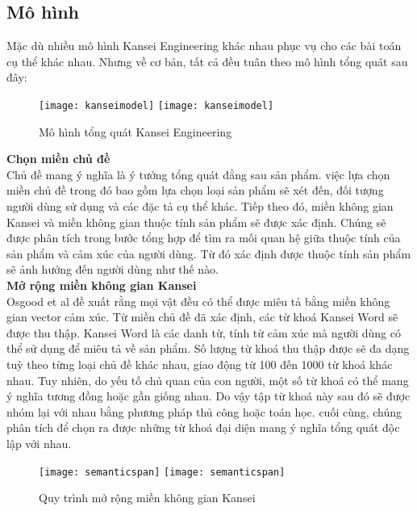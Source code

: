 \subsection{Mô hình}
Mặc dù nhiều mô hình Kansei Engineering khác nhau phục vụ cho các bài toán cụ thể khác nhau. Nhưng về cơ bản, tất cả đều tuân theo mô hình tổng quát \cite{KE05} sau đây:
\begin{figure}[H]
  \begin{center}
    \ifpdf
      \texttt{[image: kanseimodel]}
    \else
      \texttt{[image: kanseimodel]}
    \fi
    \caption{Mô hình tổng quát Kansei Engineering}
    \label{KanseiModel}
  \end{center}
\end{figure}

\textbf{Chọn miền chủ đề}\\

Chủ đề mang ý nghĩa là ý tưởng tổng quát đằng sau sản phẩm. việc lựa chọn miền chủ đề trong đó bao gồm lựa chọn loại sản phẩm sẽ xét đến, đối tượng người dùng sử dụng và các đặc tả cụ thể khác. Tiếp theo đó, miền không gian Kansei và miền không gian thuộc tính sản phẩm sẽ được xác định. Chúng sẽ được phân tích trong bước tổng hợp để tìm ra mối quan hệ giữa thuộc tính của sản phẩm và cảm xúc của người dùng. Từ đó xác định được thuộc tính sản phẩm sẽ ảnh hưởng đến người dùng như thế nào.\\

\textbf{Mở rộng miền không gian Kansei}\\

Osgood et al\cite{osgood} đề xuất rằng mọi vật đều có thể được miêu tả bằng miền không gian vector cảm xúc. Từ miền chủ đề đã xác định, các từ khoá Kansei Word sẽ được thu thập. Kansei Word là các danh từ, tính từ cảm xúc mà người dùng có thể sử dụng để miêu tả về sản phẩm. Số lượng từ khoá thu thập được sẽ đa dạng tuỳ theo từng loại chủ đề khác nhau, giao động từ 100 đến 1000 từ khoá khác nhau. Tuy nhiên, do yếu tố chủ quan của con người, một số từ khoá có thể mang ý nghĩa tương đồng hoặc gần giống nhau. Do vậy tập từ khoá này sau đó sẽ được nhóm lại với nhau bằng phương pháp thủ công hoặc toán học. cuối cùng, chúng phân tích để chọn ra được những từ khoá đại diện mang ý nghĩa tổng quát độc lập với nhau.

\begin{figure}[H]
  \begin{center}
    \ifpdf
      \texttt{[image: semanticspan]}
    \else
      \texttt{[image: semanticspan]}
    \fi
    \caption{Quy trình mở rộng miền không gian Kansei}
    \label{SemanticSpanningPhase}
  \end{center}
\end{figure}

